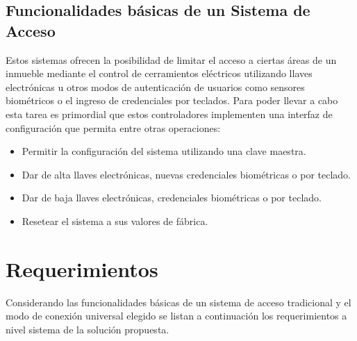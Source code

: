 \subsection{Funcionalidades básicas de un Sistema de Acceso}
Estos sistemas ofrecen la posibilidad de limitar el acceso a ciertas áreas de un inmueble mediante el control de cerramientos eléctricos utilizando llaves electrónicas u otros modos de autenticación de usuarios como sensores biométricos o el ingreso de credenciales por teclados. Para poder llevar a cabo esta tarea es primordial que estos controladores implementen una interfaz de configuración que permita entre otras operaciones:
\begin{itemize}
	\item Permitir la configuración del sistema utilizando una clave maestra.
	\item Dar de alta llaves electrónicas, nuevas credenciales biométricas o por teclado.
	\item Dar de baja llaves electrónicas, credenciales biométricas o por teclado.
	\item Resetear el sistema a sus valores de fábrica.
\end{itemize}
\section{Requerimientos}
Considerando las funcionalidades básicas de un sistema de acceso tradicional y el modo de conexión universal elegido se listan a continuación los requerimientos a nivel sistema de la solución propuesta.
